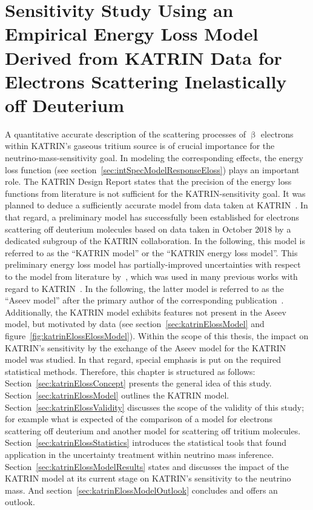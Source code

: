 \def\currentRootFolder{chapter/sensitivityStudyWithPreliminaryKatrinElossModel}
\def\currentFigureFolder{\currentRootFolder/fig}

\chapter{Sensitivity Study Using an Empirical Energy Loss Model Derived from KATRIN Data for Electrons Scattering Inelastically off Deuterium}
\label{sec:katrinEloss}
A quantitative accurate description of the scattering processes of $\upbeta$ electrons within KATRIN's gaseous tritium source is of crucial importance for the neutrino-mass-sensitivity goal. In modeling the corresponding effects, the energy loss function (see section~\ref{sec:intSpecModelResponseEloss}) plays an important role. The KATRIN Design Report states that the precision of the energy loss functions from literature is not sufficient for the KATRIN-sensitivity goal. It was planned to deduce a sufficiently accurate model from data taken at KATRIN~\cite{Angrik:2005ep}. In that regard, a preliminary model has successfully been established for electrons scattering off deuterium molecules based on data taken in October 2018 by a dedicated subgroup of the KATRIN collaboration. In the following, this model is referred to as the ``KATRIN model'' or the ``KATRIN energy loss model''. This preliminary energy loss model has partially-improved uncertainties with respect to the model from literature by~\cite{Aseev2000}, which was used in many previous works with regard to KATRIN~\cite{Groh2015,Kleesiek2014, Kleesiek2019, SeitzM2019}. In the following, the latter model is referred to as the ``Aseev model'' after the primary author of the corresponding publication~\cite{Aseev2000}. Additionally, the KATRIN model exhibits features not present in the Aseev model, but motivated by data (see section~\ref{sec:katrinElossModel} and figure~\ref{fig:katrinElossElossModel}). Within the scope of this thesis, the impact on KATRIN's sensitivity by the exchange of the Aseev model for the KATRIN model was studied. In that regard, special emphasis is put on the required statistical methods. Therefore, this chapter is structured as follows: Section~\ref{sec:katrinElossConcept} presents the general idea of this study. Section~\ref{sec:katrinElossModel} outlines the KATRIN model. Section~\ref{sec:katrinElossValidity} discusses the scope of the validity of this study; for example what is expected of the comparison of a model for electrons scattering off deuterium and another model for scattering off tritium molecules. Section~\ref{sec:katrinElossStatistics} introduces the statistical tools that found application in the uncertainty treatment within neutrino mass inference. Section~\ref{sec:katrinElossModelResults} states and discusses the impact of the KATRIN model at its current stage on KATRIN's sensitivity to the neutrino mass. And section~\ref{sec:katrinElossModelOutlook} concludes and offers an outlook.

